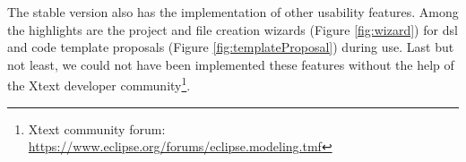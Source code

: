 %     

The stable version also has the implementation of other usability features.
Among the highlights are the project and file creation wizards (Figure \ref{fig:wizard}) for \ac{dsl} and code template proposals (Figure \ref{fig:templateProposal}) during use.
Last but not least, we could not have been implemented these features without the help of the Xtext developer community\footnote{Xtext community forum: \url{https://www.eclipse.org/forums/eclipse.modeling.tmf}}.

